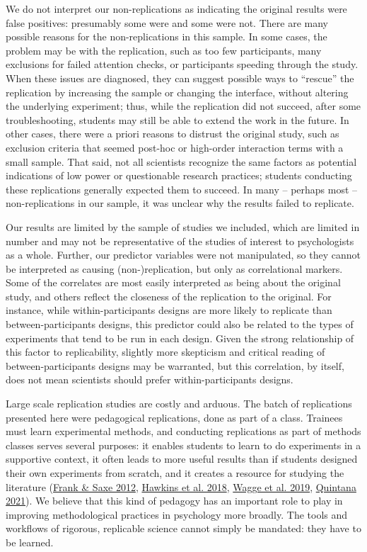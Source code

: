 \documentclass[
  english,
  a4paper,
]{article}
\begin{document}
We do not interpret our non-replications as indicating the original results were false positives: presumably some were and some were not. There are many possible reasons for the non-replications in this sample. In some cases, the problem may be with the replication, such as too few participants, many exclusions for failed attention checks, or participants speeding through the study. When these issues are diagnosed, they can suggest possible ways to ``rescue'' the replication by increasing the sample or changing the interface, without altering the underlying experiment; thus, while the replication did not succeed, after some troubleshooting, students may still be able to extend the work in the future. In other cases, there were a priori reasons to distrust the original study, such as exclusion criteria that seemed post-hoc or high-order interaction terms with a small sample. That said, not all scientists recognize the same factors as potential indications of low power or questionable research practices; students conducting these replications generally expected them to succeed. In many -- perhaps most -- non-replications in our sample, it was unclear why the results failed to replicate.

Our results are limited by the sample of studies we included, which are limited in number and may not be representative of the studies of interest to psychologists as a whole. Further, our predictor variables were not manipulated, so they cannot be interpreted as causing (non-)replication, but only as correlational markers. Some of the correlates are most easily interpreted as being about the original study, and others reflect the closeness of the replication to the original. For instance, while within-participants designs are more likely to replicate than between-participants designs, this predictor could also be related to the types of experiments that tend to be run in each design. Given the strong relationship of this factor to replicability, slightly more skepticism and critical reading of between-participants designs may be warranted, but this correlation, by itself, does not mean scientists should prefer within-participants designs.

Large scale replication studies are costly and arduous. The batch of replications presented here were pedagogical replications, done as part of a class. Trainees must learn experimental methods, and conducting replications as part of methods classes serves several purposes: it enables students to learn to do experiments in a supportive context, it often leads to more useful results than if students designed their own experiments from scratch, and it creates a resource for studying the literature (\protect\hyperlink{ref-frank2012}{Frank \& Saxe 2012}, \protect\hyperlink{ref-hawkins2018}{Hawkins et al. 2018}, \protect\hyperlink{ref-wagge2019}{Wagge et al. 2019}, \protect\hyperlink{ref-quintana2021}{Quintana 2021}). We believe that this kind of pedagogy has an important role to play in improving methodological practices in psychology more broadly. The tools and workflows of rigorous, replicable science cannot simply be mandated: they have to be learned.
\end{document}
